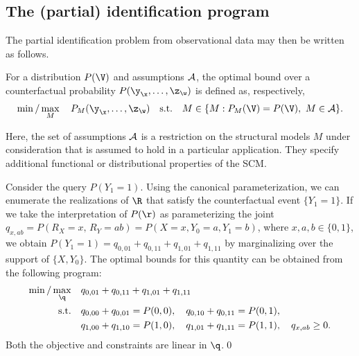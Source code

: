 \subsection{The (partial) identification program}
\label{sec:program}

The partial identification problem from observational data may then be written as follows.

\begin{definition}
  \label{def:optimal_bound}
  For a distribution $P(\V)$ and assumptions $\mathcal{A}$, the optimal bound over a counterfactual probability $P(\y_\x, \ldots, \z_\w)$ is defined as, respectively,
  \begin{align}
    \label{eq:counterfactual_bounds}
    \min/\max_{M} \quad P_M(\y_\x, \ldots, \z_\w) \quad\text{s.t.}\quad M \in \{M: P_M(\V) = P(\V),\ M\in\1A\}.
  \end{align}
\end{definition}

Here, the set of assumptions $\mathcal{A}$ is a restriction on the structural models $M$ under consideration that is assumed to hold in a particular application. They specify additional functional or distributional properties of the SCM. 


\begin{example}
  Consider the query $P(Y_1{=}1)$. Using the canonical parameterization, we can enumerate the realizations of $\R$ that satisfy the counterfactual event $\{Y_1{=}1\}$. If we take the interpretation of $P(\r)$ as parameterizing the joint $q_{x,ab}=P(R_X{=}x,\,R_Y{=}ab)=P(X=x,Y_0=a,Y_1=b)$, where $x,a,b \in \{0,1\}$, we obtain $P(Y_{1}{=}1)=q_{0,01}+q_{0,11}+q_{1,01}+q_{1,11}$ by marginalizing over the support of $\{X,Y_0\}$. The optimal bounds for this quantity can be obtained from the following program:
  \begin{align}
    \label{eq:bow_bounds}
    \min/\max_{\q} \quad & q_{0,01}+q_{0,11}+q_{1,01}+q_{1,11} \\
    \text{s.t.}\quad & q_{0,00}+q_{0,01}=P(0,0),\quad q_{0,10}+q_{0,11}=P(0,1), \nonumber\\
    & q_{1,00}+q_{1,10}=P(1,0),\quad q_{1,01}+q_{1,11}=P(1,1),\quad q_{x,ab} \ge 0. \nonumber
  \end{align}
  Both the objective and constraints are linear in $\q$.\qed
\end{example}

